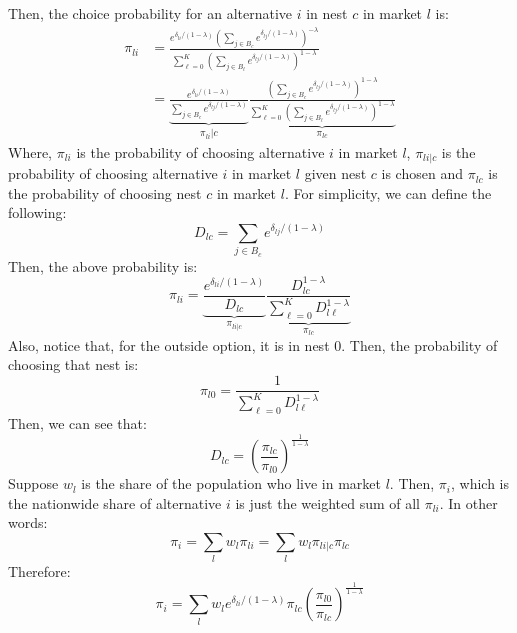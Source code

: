 \documentclass[12pt]{article}
\begin{document}
Then, the choice probability for an alternative $i$ in nest $c$ in market $l$ is:
\begin{align}
    \pi_{li}  &=\frac{e^{\delta_{li}/(1-\lambda)}\left(\sum_{j\in B_c}e^{\delta_{lj}/(1-\lambda)}\right)^{-\lambda}}{\sum_{\ell=0}^K\left(\sum_{j\in B_\ell}e^{\delta_{lj}/(1-\lambda)}\right)^{1-\lambda}} \nonumber \\
    & = \underbrace{\frac{e^{\delta_{li}/(1-\lambda)}}{\sum_{j\in B_c}e^{\delta_{lj}/(1-\lambda)}}}_{\pi_{li}|c} \underbrace{\frac{\left(\sum_{j\in B_c}e^{\delta_{lj}/(1-\lambda)}\right)^{1-\lambda}}{\sum_{\ell=0}^K\left(\sum_{j\in B_\ell}e^{\delta_{lj}/(1-\lambda)}\right)^{1-\lambda}}}_{\pi_{lc}}
\end{align}
Where, $\pi_{li}$ is the probability of choosing alternative $i$ in market $l$, $\pi_{li|c}$ is the probability of choosing alternative $i$ in market $l$ given nest $c$ is chosen and $\pi_{lc}$ is the probability of choosing nest $c$ in market $l$.
For simplicity, we can define the following:
\begin{equation*}
    \boxed{D_{lc} = \sum_{j\in B_c}e^{\delta_{lj}/(1-\lambda)}}
\end{equation*}
Then, the above probability is:
\begin{equation}
\boxed{
    \pi_{li} = \underbrace{\frac{e^{\delta_{li}/(1-\lambda)}}{D_{lc}}}_{\pi_{li|c}} \underbrace{\frac{D_{lc}^{1-\lambda}}{\sum_{\ell=0}^K D_{l\ell}^{1-\lambda}}}_{\pi_{lc}}}
\end{equation}
Also, notice that, for the outside option, it is in nest 0. Then, the probability of choosing that nest is:
\begin{equation}
    \boxed{\pi_{l0} = \frac{1}{\sum_{\ell=0}^K D_{l\ell}^{1-\lambda}}}
\end{equation}
Then, we can see that:
\begin{equation}
    \boxed{D_{lc} = \left(\frac{\pi_{lc}}{\pi_{l0}}\right)^{\frac{1}{1-\lambda}}}
\end{equation}
Suppose $w_l$ is the share of the population who live in market $l$. Then, $\pi_{i}$, which is the nationwide share of alternative $i$ is just the weighted sum of all $\pi_{li}$. In other words:
\begin{equation}
    \pi_{i} = \sum_{l} w_l \pi_{li} = \sum_{l} w_l \pi_{li|c} \pi_{lc}\nonumber
\end{equation}
Therefore:
\begin{equation}
    \pi_{i} = \sum_{l} w_l 
    e^{\delta_{li}/(1-\lambda)} \pi_{lc} \left(\frac{\pi_{l0}}{\pi_{lc}}\right)^{\frac{1}{1-\lambda}}
\end{equation}
\end{document}
